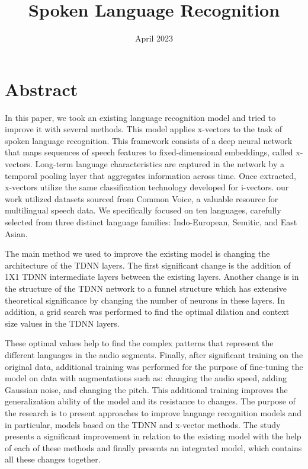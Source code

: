 \documentclass[a4paper]{article}
\title{Spoken Language Recognition}
\date{April 2023}
\begin{document}
\maketitle

\section{Abstract}

In this paper, we took an existing language recognition model and tried to improve it with several methods. This model applies x-vectors to the task of spoken language recognition. This framework consists of a deep neural network that maps sequences of speech features to fixed-dimensional embeddings, called x-vectors. Long-term language characteristics are captured in the network by a temporal pooling layer that aggregates information across time. Once extracted, x-vectors utilize the same classification technology developed for i-vectors.
our work utilized datasets sourced from Common Voice, a valuable resource for multilingual speech data. We specifically focused on ten languages, carefully selected from three distinct language families: Indo-European, Semitic, and East Asian.

The main method we used to improve the existing model is changing the architecture of the TDNN layers. The first significant change is the addition of 1X1 TDNN intermediate layers between the existing layers. Another change is in the structure of the TDNN network to a funnel structure which has extensive theoretical significance by changing the number of neurons in these layers. In addition, a grid search was performed to find the optimal dilation and context size values in the TDNN layers. 

These optimal values help to find the complex patterns that represent the different languages in the audio segments. Finally, after significant training on the original data, additional training was performed for the purpose of fine-tuning the model on data with augmentations such as: changing the audio speed, adding Gaussian noise, and changing the pitch. This additional training improves the generalization ability of the model and its resistance to changes.
The purpose of the research is to present approaches to improve language recognition models and in particular, models based on the TDNN and x-vector methods. The study presents a significant improvement in relation to the existing model with the help of each of these methods and finally presents an integrated model, which contains all these changes together.
\end{document}
